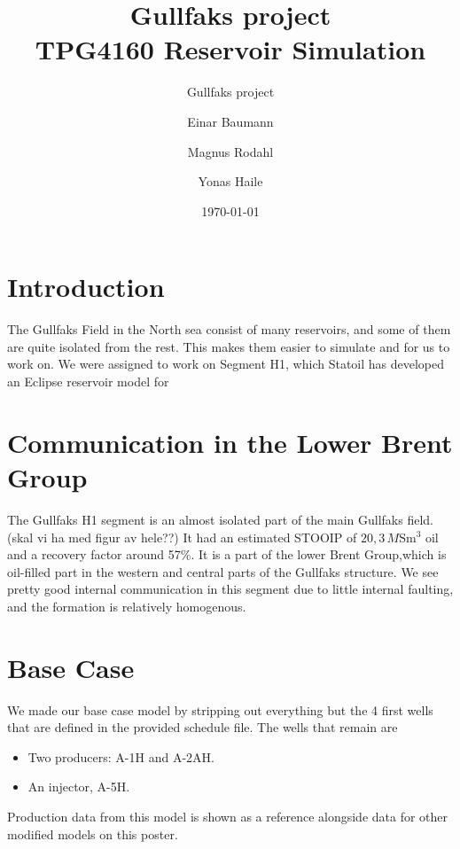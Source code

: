 \documentclass[final]{beamer}
\title[]{{\huge Gullfaks project} \\ \vspace{0.3em} {\large TPG4160 Reservoir Simulation}}
\subtitle{Gullfaks project}
\author{Einar Baumann \and Magnus Rodahl \and Yonas Haile}
\institute[]{Norwegian University of Science and Technology}
\date{\today}
\begin{document}
\begin{frame}[t]
\begin{multicols}{3}





\section{Introduction} %
The Gullfaks Field in the North sea consist of many reservoirs, and some of them are quite isolated from the rest. This makes them easier to simulate and for us to work on. We were assigned to work on Segment H1, which Statoil has developed an Eclipse reservoir model for



\section{Communication in the Lower Brent Group}
The Gullfaks H1 segment is an almost isolated part of the main Gullfaks field. (skal vi ha med figur av hele??) It had an estimated STOOIP of $20,3 \,M\mathrm{Sm^3}$ oil and a recovery factor around 57\%. It is a part of the lower Brent Group,which is oil-filled part in the western and central parts of the Gullfaks structure. We see pretty good internal communication in this segment due to little internal faulting, and the formation is relatively homogenous.










\section{Base Case}
We made our base case model by stripping out everything but the 4 first wells  that are defined in the provided schedule file. The wells that remain are
\begin{itemize}
  \item Two producers: A-1H and A-2AH.
  \item An injector, A-5H.
\end{itemize}
Production data from this model is shown as a reference alongside data for other modified models on this poster.











\end{multicols}
\end{frame}
\end{document}
